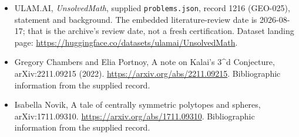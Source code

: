 \documentclass[11pt,a4paper]{article}
\begin{document}
{\small

\begin{itemize}

\item[\hypertarget{source:1216:1}{S1}] ULAM.AI, \emph{UnsolvedMath}, supplied \texttt{problems.json}, record 1216 (GEO-025), statement and background. The embedded literature-review date is 2026-08-17; that is the archive’s review date, not a fresh certification. Dataset landing page: \url{https://huggingface.co/datasets/ulamai/UnsolvedMath}.

\item[\hypertarget{source:1216:2}{S2}] Gregory Chambers and Elia Portnoy, A note on Kalai's 3\textasciicircum{}d Conjecture, arXiv:2211.09215 (2022). \url{https://arxiv.org/abs/2211.09215}. Bibliographic information from the supplied record.

\item[\hypertarget{source:1216:3}{S3}] Isabella Novik, A tale of centrally symmetric polytopes and spheres, arXiv:1711.09310. \url{https://arxiv.org/abs/1711.09310}. Bibliographic information from the supplied record.

\end{itemize}

}

\label{end:1216}
\end{document}
